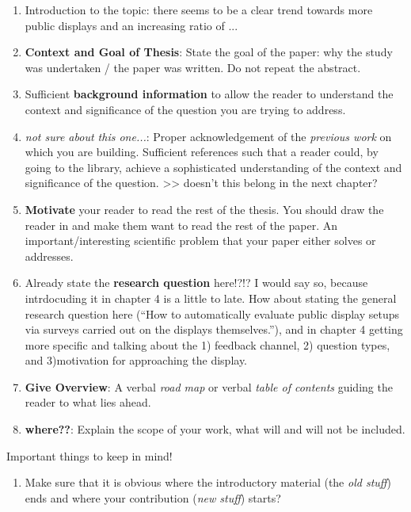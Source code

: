 	\begin{enumerate}
		\item Introduction to the topic: there seems to be a clear trend towards more public displays and an increasing ratio of ...

		\item \textbf{Context and Goal of Thesis}: State the goal of the paper: why the study was undertaken / the paper was written. Do not repeat the abstract. 

		\item Sufficient \textbf{background information} to allow the reader to understand the context and significance of the question you are trying to address. 

		\item \textit{not sure about this one...}: Proper acknowledgement of the \textit{previous work} on which you are building. Sufficient references such that a reader could, by going to the library, achieve a sophisticated understanding of the context and significance of the question.  >> doesn't this belong in the next chapter?


		\item \textbf{Motivate} your reader to read the rest of the thesis. You should draw the reader in and make them want to read the rest of the paper. An important/interesting scientific problem that your paper either solves or addresses.

		\item Already state the \textbf{research question} here!?!? I would say so, because intrdocuding it in chapter 4 is a little to late. How about stating the general research question here (``How to automatically evaluate public display setups via surveys carried out on the displays themselves.''), and in chapter 4 getting more specific and talking about the 1) feedback channel, 2) question types, and 3)motivation for approaching the display.

		\item \textbf{Give Overview}: A verbal \textit{road map} or verbal \textit{table of contents} guiding the reader to what lies ahead. 

		\item \textbf{where??}: Explain the scope of your work, what will and will not be included. 
	\end{enumerate}




Important things to keep in mind!

  \begin{enumerate}
  \item Make sure that it is obvious where the introductory material (the \textit{old stuff}) ends and where your contribution (\textit{new stuff}) starts?
  \end{enumerate}






